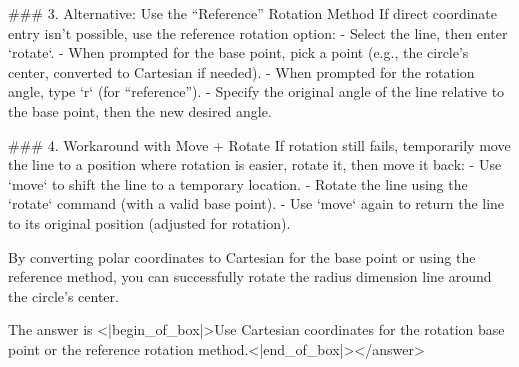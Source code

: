 ### 3. Alternative: Use the “Reference” Rotation Method  
If direct coordinate entry isn’t possible, use the reference rotation option:  
- Select the line, then enter `rotate`.  
- When prompted for the base point, pick a point (e.g., the circle’s center, converted to Cartesian if needed).  
- When prompted for the rotation angle, type `r` (for “reference”).  
- Specify the original angle of the line relative to the base point, then the new desired angle.  

### 4. Workaround with Move + Rotate  
If rotation still fails, temporarily move the line to a position where rotation is easier, rotate it, then move it back:  
- Use `move` to shift the line to a temporary location.  
- Rotate the line using the `rotate` command (with a valid base point).  
- Use `move` again to return the line to its original position (adjusted for rotation).  

By converting polar coordinates to Cartesian for the base point or using the reference method, you can successfully rotate the radius dimension line around the circle’s center.  

The answer is <|begin_of_box|>Use Cartesian coordinates for the rotation base point or the reference rotation method.<|end_of_box|></answer>